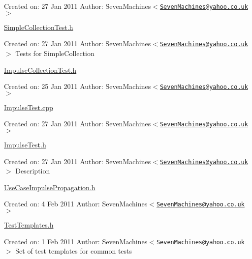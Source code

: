 Created on: 27 Jan 2011 Author: SevenMachines$<$\href{mailto:SevenMachines@yahoo.co.uk}{\tt SevenMachines@yahoo.co.uk}$>$

\hyperlink{_simple_collection_test_8h}{SimpleCollectionTest.h}

Created on: 27 Jan 2011 Author: SevenMachines$<$\href{mailto:SevenMachines@yahoo.co.uk}{\tt SevenMachines@yahoo.co.uk}$>$ Tests for SimpleCollection

\hyperlink{_impulse_collection_test_8h}{ImpulseCollectionTest.h}

Created on: 25 Jan 2011 Author: SevenMachines$<$\href{mailto:SevenMachines@yahoo.co.uk}{\tt SevenMachines@yahoo.co.uk}$>$

\hyperlink{_impulse_test_8cpp}{ImpulseTest.cpp}

Created on: 27 Jan 2011 Author: SevenMachines$<$\href{mailto:SevenMachines@yahoo.co.uk}{\tt SevenMachines@yahoo.co.uk}$>$

\hyperlink{_impulse_test_8h}{ImpulseTest.h}

Created on: 27 Jan 2011 Author: SevenMachines$<$\href{mailto:SevenMachines@yahoo.co.uk}{\tt SevenMachines@yahoo.co.uk}$>$ Description

\hyperlink{_use_case_impulse_propagation_8h}{UseCaseImpulsePropagation.h}

Created on: 4 Feb 2011 Author: SevenMachines$<$\href{mailto:SevenMachines@yahoo.co.uk}{\tt SevenMachines@yahoo.co.uk}$>$

\hyperlink{_test_templates_8h}{TestTemplates.h}

Created on: 1 Feb 2011 Author: SevenMachines$<$\href{mailto:SevenMachines@yahoo.co.uk}{\tt SevenMachines@yahoo.co.uk}$>$ Set of test templates for common tests 
